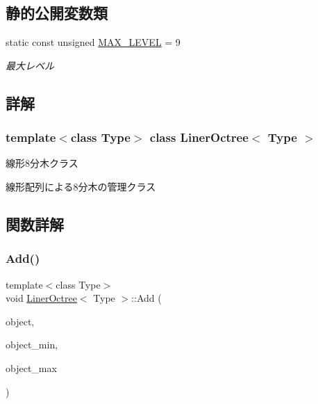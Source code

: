 \subsection*{静的公開変数類}
\begin{DoxyCompactItemize}
\item 
static const unsigned \mbox{\hyperlink{class_liner_octree_aced865f2822181486eb805e4db1f0a32}{M\+A\+X\+\_\+\+L\+E\+V\+EL}} = 9
\begin{DoxyCompactList}\small\item\em 最大レベル \end{DoxyCompactList}\end{DoxyCompactItemize}


\subsection{詳解}
\subsubsection*{template$<$class Type$>$\newline
class Liner\+Octree$<$ Type $>$}

線形8分木クラス 

線形配列による8分木の管理クラス 

\subsection{関数詳解}
\mbox{\label{class_liner_octree_ac5773a5193942a68f77a33baed9d69d4}} 
\subsubsection{\texorpdfstring{Add()}{Add()}}
{\footnotesize\ttfamily template$<$class Type$>$ \\
void \mbox{\hyperlink{class_liner_octree}{Liner\+Octree}}$<$ Type $>$\+::Add (\begin{DoxyParamCaption}\item[{\mbox{\hyperlink{class_object_of_tree}{Object\+Of\+Tree}}$<$ Type $>$ $\ast$}]{object,  }\item[{const \mbox{\hyperlink{_vector3_d_8h_ab16f59e4393f29a01ec8b9bbbabbe65d}{Vec3}} $\ast$}]{object\+\_\+min,  }\item[{const \mbox{\hyperlink{_vector3_d_8h_ab16f59e4393f29a01ec8b9bbbabbe65d}{Vec3}} $\ast$}]{object\+\_\+max }\end{DoxyParamCaption})\hspace{0.3cm}{\ttfamily [inline]}}



